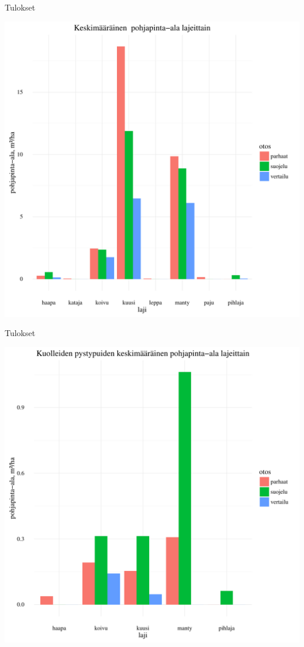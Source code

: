 \documentclass{beamer}
\begin{document}
\begin{frame}{Tulokset}
  \begin{center}
    \includegraphics[height = 0.9\textheight]{pohja-ala.pdf}
  \end{center}
\end{frame}

\begin{frame}{Tulokset}
  \begin{center}
    \includegraphics[height = 0.9\textheight]{pystypuut.pdf}
  \end{center}
\end{frame}
\end{document}
